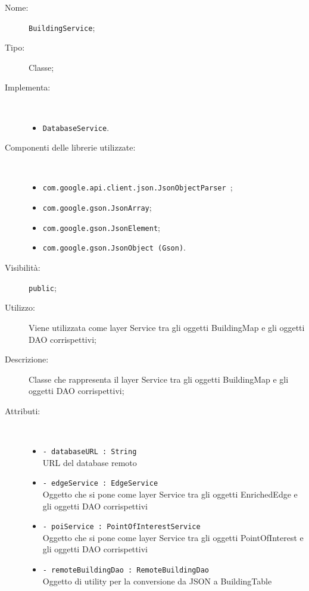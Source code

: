 \documentclass[../DefinizioneDiProdotto.tex]{subfiles}
\begin{document}
\begin{description}
	\item[Nome:] \texttt{BuildingService};
	\item[Tipo:] Classe;
	\item[Implementa:] \
	\begin{itemize}
		\item \texttt{DatabaseService}.
		
	\end{itemize}
	\item[Componenti delle librerie utilizzate:] \
	\begin{itemize}
		\item \texttt{com.google.api.client.json.JsonObjectParser
		};
		
		\item \texttt{com.google.gson.JsonArray};
		
		\item \texttt{com.google.gson.JsonElement};
		
		\item \texttt{com.google.gson.JsonObject (Gson)}.
		
	\end{itemize}
	\item[Visibilità:] \texttt{public};
	\item[Utilizzo:] Viene utilizzata come layer Service tra gli oggetti BuildingMap e gli oggetti DAO corrispettivi;
	\item[Descrizione:] Classe che rappresenta il layer Service tra gli oggetti BuildingMap e gli oggetti DAO corrispettivi;
	\item[Attributi:] \
	\begin{itemize}
		\item \texttt{- databaseURL : String}\\
		URL del database remoto
		
		\item \texttt{- edgeService : EdgeService}\\
		Oggetto che si pone come layer Service tra gli oggetti EnrichedEdge e gli oggetti DAO corrispettivi
		
		\item \texttt{- poiService : PointOfInterestService}\\
		Oggetto che si pone come layer Service tra gli oggetti PointOfInterest e gli oggetti DAO corrispettivi
		
		\item \texttt{- remoteBuildingDao : RemoteBuildingDao}\\
		Oggetto di utility per la conversione da JSON a BuildingTable
		

\end{itemize}
\end{description}
\end{document}
